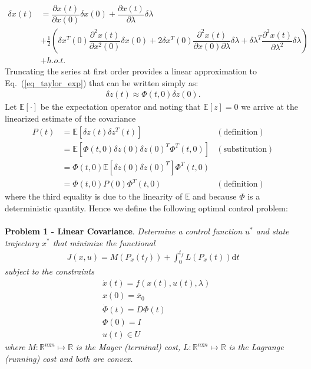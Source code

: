 \documentclass[10pt,a4paper]{article}
\begin{document}
	\begin{align}
	\delta x(t) &= \dfrac{\partial x(t)}{\partial x(0)} \delta x(0) + \dfrac{\partial x(t)}{\partial \lambda} \delta \lambda \nonumber\\
	&+\frac{1}{2}\left(\delta x^T(0) \dfrac{\partial^2 x(t)}{\partial x^2(0)} \delta x(0) + 2\delta x^T(0)\dfrac{\partial^2 x(t)}{\partial x(0)\partial\lambda} \delta \lambda +\delta \lambda^T \dfrac{\partial^2 x(t)}{\partial \lambda^2} \delta \lambda\right) \label{eq_taylor_exp}\\
	\nonumber &+ h.o.t.
	\end{align}
	Truncating the series at first order provides a linear approximation to Eq.~(\ref{eq_taylor_exp}) that can be written simply as:
	\begin{align}
	\delta z(t) \approx \Phi(t,0)\delta z(0).
	\end{align}
	Let $\mathbb{E}[\cdot]$ be the expectation operator and noting that $\mathbb{E}[z]=0$ we arrive at the linearized estimate of the covariance
	\begin{align}
	P(t) &= \mathbb{E}[\delta z(t)\delta z^T(t)] &\mathrm{ (definition)} \\
	     &= \mathbb{E}[\Phi(t,0)\delta z(0)\delta z(0)^T\Phi^T(t,0)] &\mathrm{(substitution)} \\
	     &= \Phi(t,0)\mathbb{E}[\delta z(0)\delta z(0)^T] \Phi^T(t,0) \\
	     &= \Phi(t,0)P(0)\Phi^T(t,0) &\mathrm{ (definition)}
	\end{align}
	where the third equality is due to the linearity of $\mathbb{E}$ and because $\Phi$ is a deterministic quantity. Hence we define the following optimal control problem:
	\\\\
	\textbf{Problem 1 - Linear Covariance}. \textit{Determine a control function $ u^* $ and state trajectory $ x^* $ that minimize the functional}
	\begin{align}
	J(x,u) = M(P_x(t_f)) + \int_{0}^{t_f}L(P_x(t))\mathrm{d}t
	\end{align}
	\textit{	subject to the constraints }
	\begin{align}
	&\dot{x}(t) = f(x(t),u(t),\lambda) \\
	&x(0) = \bar{x}_0 \\
	&\dot{\Phi}(t) = D\Phi(t) \\
	&\Phi(0) = I \\
	&u(t) \in U
	\end{align}
	\textit{where} $ M:\mathbb{R}^{n\mathrm{x}n}\mapsto \mathbb{R} $ \textit{is the Mayer (terminal) cost,}  $L:\mathbb{R}^{n\mathrm{x}n}\mapsto\mathbb{R}$ \textit{ is the Lagrange (running) cost and both are convex.}
	
\end{document}
